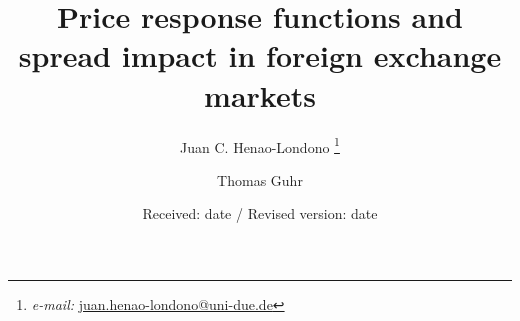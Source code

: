 \title{Price response functions and spread impact in foreign exchange markets}
\author{Juan C. Henao-Londono
        \thanks{\emph{e-mail: }\href{mailto:juan.henao-londono@uni-due.de}
        {juan.henao-londono@uni-due.de}}
        \and Thomas Guhr}
\date{Received: date / Revised version: date}
